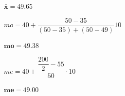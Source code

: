 \begin{ejemplo}
\begin{ejre}
\begin{multicols}{2}
\hspace{1cm} $\boldsymbol{ \bar{x}=49.65 }$

\hspace{1cm} \begin{scriptsize}$mo=40+\dfrac{50-35}{(50-35)+(50-49)} 10$\end{scriptsize}

\hspace{1cm} $\boldsymbol{ mo=49.38 }$

\hspace{1cm} \begin{footnotesize}$me=40+\dfrac{\dfrac{200}{2}-55}{50}\cdot 10$\end{footnotesize}

\hspace{1cm} $\boldsymbol{ me=49.00 }$

\end{multicols}

\end{ejre}
\end{ejemplo}


